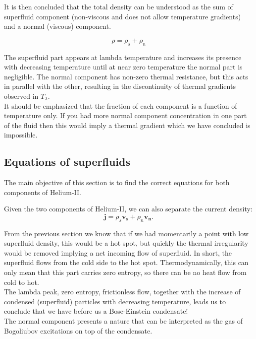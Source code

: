 \documentclass{article}
\begin{document}
It is then concluded that the total density can be understood as the sum of superfluid component (non-viscous and does not allow temperature gradients) and a normal (viscous) component.

\[\rho = \rho_s + \rho_n\]

The superfluid part appears at lambda temperature and increases its presence with decreasing temperature until at near zero temperature the normal part is negligible. The normal component has non-zero thermal resistance, but this acts in parallel with the other, resulting in the discontinuity of thermal gradients observed in $T_\lambda$.
\\

It should be emphasized that the fraction of each component is a function of temperature only. If you had more normal component concentration in one part of the fluid then this would imply a thermal gradient which we have concluded is impossible.
\\

\subsection{Equations of superfluids}

The main objective of this section is to find the correct equations for both components of Helium-II\@.

Given the two components of Helium-II, we can also separate the current density:
\[\mathbf{j} = \rho_s \mathbf{v_s}+\rho_n \mathbf{v_n}\text{.}\]

From the previous section we know that if we had momentarily a point with low superfluid density, this would be a hot spot, but quickly the thermal irregularity would be removed implying a net incoming flow of superfluid. In short, the superfluid flows from the cold side to the hot spot. Thermodynamically, this can only mean that this part carries zero entropy, so there can be no heat flow from cold to hot.
\\

The lambda peak, zero entropy, frictionless flow, together with the increase of condensed (superfluid) particles with decreasing temperature, leads us to conclude that we have before us a Bose-Einstein condensate!
\\

The normal component presents a nature that can be interpreted as the gas of Bogoliubov excitations on top of the condensate.
\\
\end{document}
